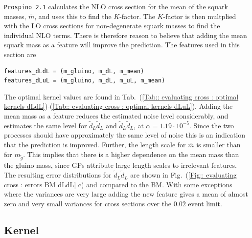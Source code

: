 \documentclass[twoside,english]{uiofysmaster}
\begin{document}
\verb|Prospino 2.1| calculates the NLO cross section for the mean of the squark masses, $\bar{m}$, and uses this to find the $K$-factor. The $K$-factor is then multplied with the LO cross sections for non-degenerate squark masses to find the individual NLO terms. There is therefore reason to believe that adding the mean squark mass as a feature will improve the prediction. The features used in this section are
\begin{lstlisting}
features_dLdL = (m_gluino, m_dL, m_mean)
features_dLuL = (m_gluino, m_dL, m_uL, m_mean)
\end{lstlisting}
The optimal kernel values are found in Tab.\ (\ref{Tab:: evaluating cross : optimal kernels dLdL})-(\ref{Tab:: evaluating cross : optimal kernels dLuL}). Adding the mean mass as a feature reduces the estimated noise level considerably, and estimates the same level for $\tilde{d}_L \tilde{d}_L$ and $\tilde{d}_L \tilde{d}_L$, at $\alpha = 1.19 \cdot 10^{-5}$. Since the two processes should have approximately the same level of noise this is an indication that the prediction is improved. Further, the length scale for $\bar{m}$ is smaller than for $m_{\tilde{g}}$. This implies that there is a higher dependence on the mean mass than the gluino mass, since GPs attribute large length scales to irrelevant features. The resulting error distributions for $\tilde{d}_L \tilde{d}_L$ are shown in Fig.\ (\ref{Fig:: evaluating cross : errors BM dLdL} c) and compared to the BM. With some exceptions where the variances are very large adding the new feature gives a mean of almost zero and very small variances for cross sections over the $0.02$ event limit. 




\subsection{Kernel}
\end{document}
